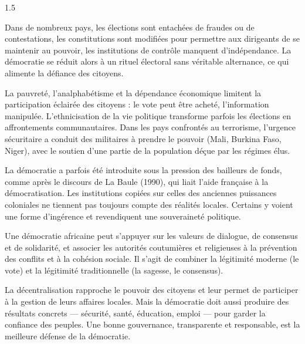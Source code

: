 \documentclass[12pt]{article}
\begin{document}
\begin{spacing}{1.5}


Dans de nombreux pays, les élections sont entachées de fraudes ou de contestations, les constitutions sont modifiées pour permettre aux dirigeants de se maintenir au pouvoir, les institutions de contrôle manquent d'indépendance. La démocratie se réduit alors à un rituel électoral sans véritable alternance, ce qui alimente la défiance des citoyens.

La pauvreté, l'analphabétisme et la dépendance économique limitent la participation éclairée des citoyens : le vote peut être acheté, l'information manipulée. L'ethnicisation de la vie politique transforme parfois les élections en affrontements communautaires. Dans les pays confrontés au terrorisme, l'urgence sécuritaire a conduit des militaires à prendre le pouvoir (Mali, Burkina Faso, Niger), avec le soutien d'une partie de la population déçue par les régimes élus.

La démocratie a parfois été introduite sous la pression des bailleurs de fonds, comme après le discours de La Baule (1990), qui liait l'aide française à la démocratisation. Les institutions copiées sur celles des anciennes puissances coloniales ne tiennent pas toujours compte des réalités locales. Certains y voient une forme d'ingérence et revendiquent une souveraineté politique.



Une démocratie africaine peut s'appuyer sur les valeurs de dialogue, de consensus et de solidarité, et associer les autorités coutumières et religieuses à la prévention des conflits et à la cohésion sociale. Il s'agit de combiner la légitimité moderne (le vote) et la légitimité traditionnelle (la sagesse, le consensus).

La décentralisation rapproche le pouvoir des citoyens et leur permet de participer à la gestion de leurs affaires locales. Mais la démocratie doit aussi produire des résultats concrets — sécurité, santé, éducation, emploi — pour garder la confiance des peuples. Une bonne gouvernance, transparente et responsable, est la meilleure défense de la démocratie.


\end{spacing}
\end{document}
